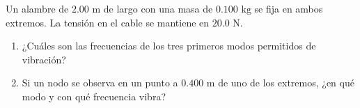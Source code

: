 \item Un alambre de $2.00\text{ m}$ de largo con una masa de $0.100\text{ kg}$ se fija en ambos extremos. La tensión en el cable se mantiene en $20.0\text{ N}$.
\begin{enumerate}
    \item ¿Cuáles son las frecuencias de los tres primeros modos permitidos de vibración?
    \item Si un nodo se observa en un punto a $0.400\text{ m}$ de uno de los extremos, ¿en qué modo y con qué frecuencia vibra?
\end{enumerate}